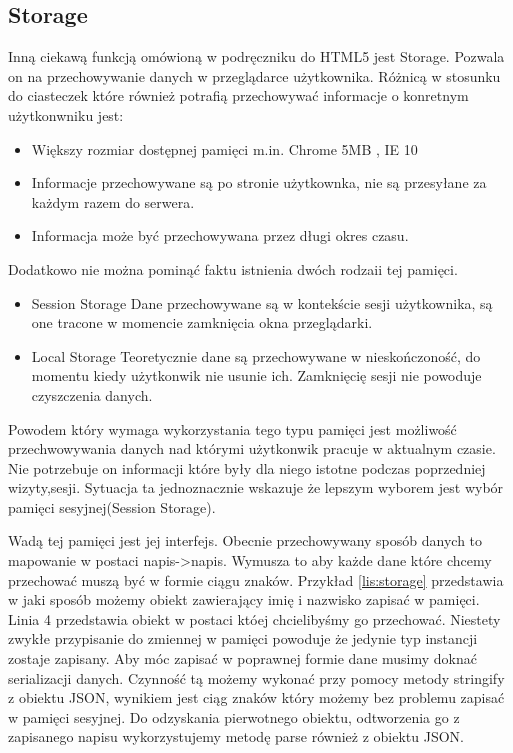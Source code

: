 \subsection{Storage}
\label{subsec:storage5}
Inną ciekawą funkcją omówioną w podręczniku do HTML5  \cite{html5dive} jest Storage. Pozwala on na przechowywanie danych w przeglądarce użytkownika. Różnicą w stosunku do ciasteczek które również potrafią przechowywać informacje o konretnym użytkonwniku jest:
\begin{itemize}
\item
Większy rozmiar dostępnej pamięci m.in. Chrome 5MB \nocite{chrome5mb}, IE 10
\item
Informacje przechowywane są po stronie użytkownka, nie są przesyłane za każdym razem do serwera.
\item
Informacja może być przechowywana przez długi okres czasu.
\end{itemize}



Dodatkowo nie można pominąć faktu istnienia dwóch rodzaii tej pamięci.
\begin{itemize}

\item
Session Storage
Dane przechowywane są w kontekście sesji użytkownika, są one tracone w momencie zamknięcia okna przeglądarki.

\item
Local Storage
Teoretycznie dane są przechowywane w nieskończoność, do momentu kiedy użytkonwik nie usunie ich. Zamknięcię sesji nie powoduje czyszczenia danych.

\end{itemize}

Powodem który wymaga wykorzystania tego typu pamięci jest możliwość przechwowywania danych nad którymi użytkonwik pracuje w aktualnym czasie. Nie potrzebuje on informacji które były dla niego istotne podczas poprzedniej wizyty,sesji. Sytuacja ta jednoznacznie wskazuje że lepszym wyborem jest wybór pamięci sesyjnej(Session Storage).


Wadą tej pamięci jest jej interfejs. Obecnie przechowywany sposób danych to mapowanie w postaci napis->napis. Wymusza to aby każde dane które chcemy przechować muszą być w formie ciągu znaków. Przykład \ref{lis:storage} przedstawia w jaki sposób możemy obiekt zawierający imię i nazwisko zapisać w pamięci. Linia 4 przedstawia obiekt w postaci któej chcielibyśmy go przechować. Niestety zwykłe przypisanie do zmiennej w pamięci powoduje że jedynie typ instancji zostaje zapisany. Aby móc zapisać w poprawnej formie dane musimy doknać serializacji danych. Czynność tą możemy wykonać przy pomocy metody stringify z obiektu JSON, wynikiem jest ciąg znaków który możemy bez problemu zapisać w pamięci sesyjnej. Do odzyskania pierwotnego obiektu, odtworzenia go z zapisanego napisu wykorzystujemy metodę parse również z obiektu JSON.

